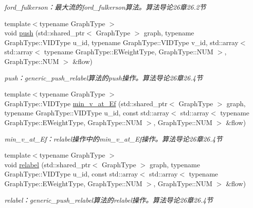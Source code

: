 \begin{DoxyCompactItemize}
\begin{DoxyCompactList}\small\item\em ford\+\_\+fulkerson：最大流的ford\+\_\+fulkerson算法。算法导论26章26.2节 \end{DoxyCompactList}\item 
{\footnotesize template$<$typename Graph\+Type $>$ }\\void \hyperlink{namespace_introduction_to_algorithm_1_1_graph_algorithm_abd520b7e33d8c1e72b05210d784ac258}{push} (std\+::shared\+\_\+ptr$<$ Graph\+Type $>$ graph, typename Graph\+Type\+::\+V\+I\+D\+Type u\+\_\+id, typename Graph\+Type\+::\+V\+I\+D\+Type v\+\_\+id, std\+::array$<$ std\+::array$<$ typename Graph\+Type\+::\+E\+Weight\+Type, Graph\+Type\+::\+N\+U\+M $>$, Graph\+Type\+::\+N\+U\+M $>$ \&flow)
\begin{DoxyCompactList}\small\item\em push：generic\+\_\+push\+\_\+relabel算法的push操作。算法导论26章26.4节 \end{DoxyCompactList}\item 
{\footnotesize template$<$typename Graph\+Type $>$ }\\Graph\+Type\+::\+V\+I\+D\+Type \hyperlink{namespace_introduction_to_algorithm_1_1_graph_algorithm_a27dfe859312abba6639bca7b232d4bd6}{min\+\_\+v\+\_\+at\+\_\+\+Ef} (std\+::shared\+\_\+ptr$<$ Graph\+Type $>$ graph, typename Graph\+Type\+::\+V\+I\+D\+Type u\+\_\+id, const std\+::array$<$ std\+::array$<$ typename Graph\+Type\+::\+E\+Weight\+Type, Graph\+Type\+::\+N\+U\+M $>$, Graph\+Type\+::\+N\+U\+M $>$ \&flow)
\begin{DoxyCompactList}\small\item\em min\+\_\+v\+\_\+at\+\_\+\+Ef：relabel操作中的min\+\_\+v\+\_\+at\+\_\+\+Ef操作。算法导论26章26.4节 \end{DoxyCompactList}\item 
{\footnotesize template$<$typename Graph\+Type $>$ }\\void \hyperlink{namespace_introduction_to_algorithm_1_1_graph_algorithm_a143924362cc9f23ca452c3ca0e292ff3}{relabel} (std\+::shared\+\_\+ptr$<$ Graph\+Type $>$ graph, typename Graph\+Type\+::\+V\+I\+D\+Type u\+\_\+id, const std\+::array$<$ std\+::array$<$ typename Graph\+Type\+::\+E\+Weight\+Type, Graph\+Type\+::\+N\+U\+M $>$, Graph\+Type\+::\+N\+U\+M $>$ \&flow)
\begin{DoxyCompactList}\small\item\em relabel：generic\+\_\+push\+\_\+relabel算法的relabel操作。算法导论26章26.4节 \end{DoxyCompactList}\item 

\end{DoxyCompactItemize}
